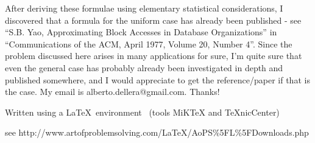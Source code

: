 \documentclass[12pt]{article}
\begin{document}
After deriving these formulae using elementary statistical considerations, I discovered that a formula for the uniform case has already been published - see "`S.B. Yao, Approximating Block Accesses in Database Organizations"' in "`Communications of the ACM, April 1977, Volume 20, Number 4"'.
Since the problem discussed here arises in many applications for sure, I'm quite sure that even the general case has probably already been investigated in depth and published somewhere, and I would appreciate to get the reference/paper if that is the case. My email is alberto.dellera@gmail.com. Thanks!


\vfill
{\footnotesize Written using a \LaTeX\ environment \ (tools MiKTeX and TeXnicCenter) 

see http://www.artofproblemsolving.com/LaTeX/AoPS\%5FL\%5FDownloads.php }
\end{document}
